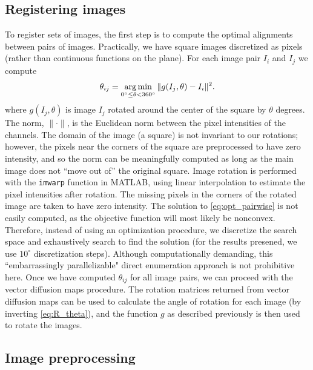 \subsection{Registering images} \label{subsec:trans_rot_register}

To register sets of images, 
the first step is to compute the optimal alignments between pairs of images.
%
Practically, we have square images discretized as pixels (rather than continuous functions on the plane).
%
For each image pair $I_i$ and $I_j$ we compute
\begin{equation}\label{eq:opt_pairwise}
\theta_{ij} = \operatorname*{arg\,min}_{
0^\circ \le \theta < 360^\circ }
 \|g(I_j, \theta) - I_i \|^2.
\end{equation}
where $g(I_j, \theta)$ is image $I_j$ rotated around the center of the square by $\theta$ degrees.
%
The norm, $\| \cdot \|$, is the Euclidean norm between the pixel intensities of the channels.
%
The domain of the image (a square) is not invariant to our rotations; however, the pixels near the corners of the square are preprocessed to have zero intensity, and so the norm can be meaningfully computed as long as the main image does not ``move out of'' the original square.
%
Image rotation is performed with the \texttt{imwarp} function in MATLAB, using linear interpolation to estimate the pixel intensities after rotation.
%
The missing pixels in the corners of the rotated image are taken to have zero intensity.
%
The solution to \eqref{eq:opt_pairwise} is not easily computed, as the objective function will most likely be nonconvex.
%
Therefore, instead of using an optimization procedure, we discretize the search space and exhaustively search to find the solution (for the results presened, we use $10^\circ$ discretization steps).
%
Although computationally demanding, this ``embarrassingly parallelizable" direct enumeration approach is not prohibitive here.
%
Once we have computed $\theta_{ij}$ for all image pairs, we can proceed with the vector diffusion maps procedure.
%
The rotation matrices returned from vector diffusion maps can be used to calculate the angle of rotation for each image (by inverting \eqref{eq:R_theta}), and the function $g$ as described previously is then used to rotate the images.



\subsection{Image preprocessing} \label{sec:image_preprocessing}


